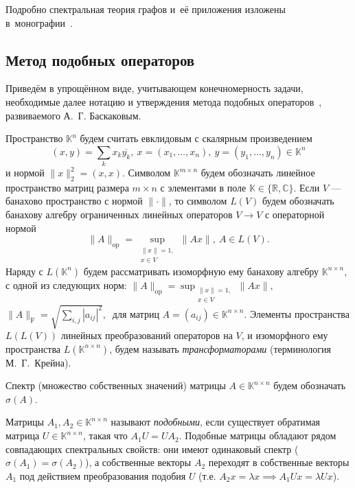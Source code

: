 \documentclass[12pt]{article}
\begin{document}
Подробно спектральная теория графов и~е\"е приложения
    изложены в~монографии~\cite{cvetkovic1980spectra}.
\subsection*{Метод подобных операторов}
Приведём в упрощённом виде, учитывающем конечномерность задачи,
    необходимые далее нотацию и утверждения
    метода подобных операторов~\cite{baskakov-harmonic,baskakov1983},
    развиваемого А.~Г. Баскаковым.


Пространство \( \mathbb{K}^n \)
    будем считать евклидовым с скалярным произведением
    \[
        (x, y){=}\sum_k x_k\overline{y_k},
        \ x{=}(x_1,\ldots, x_n),
        \ y=(y_1,\ldots, y_n)
        \in \mathbb{K}^n
        \]
    и нормой
    \(
        \|x\|_2^2{=}(x,x).
        \)
Символом \( \mathbb{K}^{m\times n} \)
    будем обозначать линейное пространство
    матриц размера \( m{\times}n \)
    с элементами в поле \( \mathbb{K}\in\{\mathbb{R},\mathbb{C}\} \).
Если \( V \) --- банахово пространство с нормой \( \|\cdot\| \),
    то символом \( L(V) \)
    будем обозначать банахову алгебру
    ограниченных линейных операторов \( V\to V \)
    с операторной нормой
\[
    \|A\|_{\mathrm{op}} = \sup_{\substack{\|x\|=1,\\ x\in V}} \|A x\|,\ A\in L(V).
    \]
Наряду с \( L(\mathbb{K}^n) \)
    будем рассматривать изоморфную ему
    банахову алгебру \( \mathbb{K}^{n\times n} \),
    с одной из следующих норм:
    \( \|A\|_{\mathrm{op}} = \sup_{\substack{\|x\|=1,\\ x\in V}} \|A x\|,\ \)
    \( \|A\|_{\mathrm{F}} = \sqrt{\sum_{i,j} |a_{ij}|^2},\ \)
    для матриц \( A{=}(a_{ij})\in\mathbb{K}^{n\times n} \).
Элементы пространства
    \( L(L(V)) \)
    линейных преобразований операторов на \( V \),
    и изоморфного ему пространства \( L(\mathbb{K}^{n\times n}) \),
    будем называть \emph{трансформаторами}
    (терминология М.~Г.~Крейна).

Спектр (множество собственных значений)
    матрицы \( A\in\mathbb{K}^{n\times n} \)
    будем обозначать \( \sigma(A) \).

Матрицы \( A_1, A_2 \in \mathbb{K}^{n\times n} \)
    называют \emph{подобными}, если существует
    обратимая матрица \( U\in\mathbb{K}^{n\times n} \),
    такая что \( A_1 U = U A_2 \).
Подобные матрицы обладают рядом совпадающих спектральных свойств:
    они имеют одинаковый спектр (\( \sigma(A_1)=\sigma(A_2) \)),
    а собственные векторы \( A_2 \) переходят
    в собственные векторы \( A_1 \) под действием
    преобразования подобия \( U \)
    (т.е. \( A_2 x = \lambda x \implies A_1 U x = \lambda U x \)).
\end{document}
